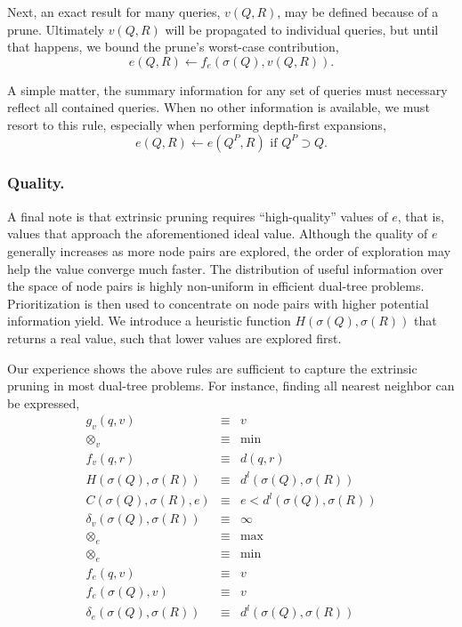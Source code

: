 \documentclass[twoside,leqno,twocolumn]{article}
\newcommand{\summary}{\delta}
\newcommand{\mysubsub}[1]{\subsubsection{#1.}}
\newcommand{\kdparent}[1]{#1^{\!P}}
\newcommand{\lo}[1]{#1^{l}}
\newcommand{\distlo}{\lo{d}}
\newcommand{\dist}[2]{d(#1,#2)}
\newcommand{\nameop}[2]{#1_{\!#2}}
\newcommand{\myop}[1]{\nameop{\otimes}{#1}}
\newcommand{\letterqr}{v}
\newcommand{\inqr}{v}
\newcommand{\opqr}{\myop{\letterqr}}
\newcommand{\fqr}{f_{\letterqr}}
\newcommand{\gqr}{g_{\letterqr}}
\newcommand{\letterqrv}{v}
\newcommand{\inqrv}{v}
\newcommand{\deltaqrv}{\summary_{\letterqrv}}
\newcommand{\lettermu}{e}
\newcommand{\inmu}{e}
\newcommand{\outopmu}{\myop{\lettermu}}
\newcommand{\opmu}{\myop{\lettermu}}
\newcommand{\fmu}{f_{\lettermu}}
\newcommand{\fmuv}{f_{\lettermu}}
\newcommand{\deltamu}{\summary_{\lettermu}}
\newcommand{\canprunemu}{C}
\newcommand{\heurqr}{H}
\newcommand{\outstat}{\sigma}
\begin{document}
Next, an exact result for many queries, $\inqrv(Q, R)$, may be defined because of a prune.
Ultimately $\inqrv(Q, R)$ will be propagated to individual queries, but until that happens, we bound the prune's worst-case contribution,
\begin{equation}
\inmu(Q, R) \gets \fmuv(\outstat(Q), \inqrv(Q, R)).
\label{eqn:muprune}
\end{equation}

\noindent
A simple matter, the summary information for any set of queries must necessary reflect all contained queries.
When no other information is available, we must resort to this rule, especially when performing depth-first expansions,
\begin{equation}
\inmu(Q, R) \gets \inmu(\kdparent{Q}, R) \text{ if } \kdparent{Q} \supset Q.
\label{eqn:muparent}
\end{equation}

\mysubsub{Quality}
A final note is that extrinsic pruning requires ``high-quality'' values of $\inmu$, that is, values that approach the aforementioned ideal value.
Although the quality of $\lettermu$ generally increases as more node pairs are explored, the order of exploration may help the value converge much faster.
The distribution of useful information over the space of node pairs is highly non-uniform in efficient dual-tree problems.
Prioritization is then used to concentrate on node pairs with higher potential information yield.
We introduce a heuristic function $\heurqr(\outstat(Q),\outstat(R))$ that returns a real value, such that lower values are explored first.

Our experience shows the above rules are sufficient to capture the extrinsic pruning in most dual-tree problems.
For instance, finding all nearest neighbor can be expressed,
\begin{eqnarray*}
\gqr(q, \inqr) &\equiv& \inqr
\\
\opqr &\equiv& \min
\\
\fqr(q,r) &\equiv& \dist{q}{r}
\\
\heurqr(\outstat(Q),\outstat(R)) &\equiv& \distlo(\outstat(Q), \outstat(R))
\\
\canprunemu(\outstat(Q), \outstat(R), \lettermu)
 &\equiv& \lettermu < \distlo(\outstat(Q), \outstat(R))
\\
\deltaqrv(\outstat(Q),\outstat(R)) &\equiv& \infty
\\
\outopmu &\equiv& \max
\\
\opmu &\equiv& \min
\\
\fmu(q, \letterqr) &\equiv& \letterqr
\\
\fmuv(\outstat(Q), \letterqrv) &\equiv& \letterqrv
\\
\deltamu(\outstat(Q),\outstat(R)) &\equiv& \distlo(\outstat(Q),\outstat(R))
\end{eqnarray*}
\end{document}
